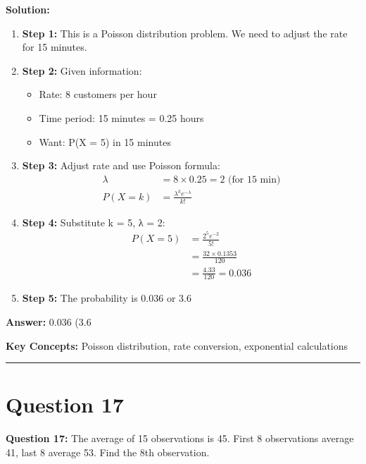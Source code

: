 \documentclass[12pt]{article}
\begin{document}
\textbf{Solution:}
\begin{enumerate}
\item \textbf{Step 1:} This is a Poisson distribution problem. We need to adjust the rate for 15 minutes.

\item \textbf{Step 2:} Given information:
\begin{itemize}
\item Rate: 8 customers per hour
\item Time period: 15 minutes = 0.25 hours  
\item Want: P(X = 5) in 15 minutes
\end{itemize}

\item \textbf{Step 3:} Adjust rate and use Poisson formula:
\begin{align}
\lambda &= 8 \times 0.25 = 2 \text{ (for 15 min)} \\
P(X = k) &= \frac{\lambda^k e^{-\lambda}}{k!}
\end{align}

\item \textbf{Step 4:} Substitute k = 5, λ = 2:
\begin{align}
P(X = 5) &= \frac{2^5 e^{-2}}{5!} \\
&= \frac{32 \times 0.1353}{120} \\
&= \frac{4.33}{120} = 0.036
\end{align}

\item \textbf{Step 5:} The probability is 0.036 or 3.6%
\end{enumerate}

\textbf{Answer:} 0.036 (3.6%

\textbf{Key Concepts:} Poisson distribution, rate conversion, exponential calculations

\hrule
\vspace{1em}

\newpage

\section{Question 17}

\textbf{Question 17:} The average of 15 observations is 45. First 8 observations average 41, last 8 average 53. Find the 8th observation.
\end{document}
